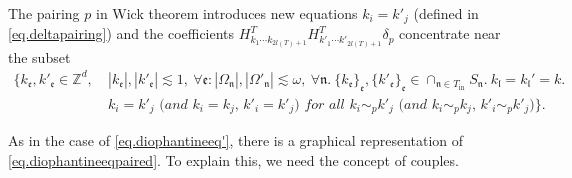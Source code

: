 The pairing $p$ in Wick theorem introduces new equations $k_{i}=k'_{j}$ (defined in \eqref{eq.deltapairing}) and the coefficients $H^T_{k_1\cdots k_{2l(T)+1}} H^{T}_{k'_1\cdots k'_{2l(T)+1}} \delta_{p}$ concentrate near the subset 
\begin{equation}\label{eq.diophantineeqpaired}
\begin{split}
    \{k_{\mathfrak{e}}, k'_{\mathfrak{e}}\in \mathbb{Z}^d,\ &|k_{\mathfrak{e}}|, |k'_{\mathfrak{e}}|\lesssim 1,\ \forall \mathfrak{e}: |\Omega_{\mathfrak{n}}|,|\Omega'_{\mathfrak{n}}|\lesssim \omega,\ \forall \mathfrak{n}. \ \{k_{\mathfrak{e}}\}_{\mathfrak{e}}, \{k'_{\mathfrak{e}}\}_{\mathfrak{e}}\in \cap_{\mathfrak{n}\in T_{\text{in}}} S_{\mathfrak{n}}.\ k_{\mathfrak{l}}=k_{\mathfrak{l}}'=k. \\
    &\textit{$k_{i}=k'_{j}$ (and $k_{i}=k_{j}$, $k'_{i}=k'_{j}$) for all $k_{i}\sim_{p}k'_{j}$ (and $k_{i}\sim_{p}k_{j}$, $k'_{i}\sim_{p}k'_{j}$)}\}.
\end{split}
\end{equation}

As in the case of \eqref{eq.diophantineeq'}, there is a graphical representation of \eqref{eq.diophantineeqpaired}. To explain this, we need the concept of couples.



